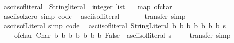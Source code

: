 \begin{isabellebody}
\ asciis{\isacharunderscore}{\kern0pt}of{\isacharunderscore}{\kern0pt}literal\ {\isacharcolon}{\kern0pt}{\isacharcolon}{\kern0pt}\ {\isachardoublequoteopen}String{\isachardot}{\kern0pt}literal\ {\isasymRightarrow}\ integer\ list{\isachardoublequoteclose}\isanewline
\ \ \ {\isachardoublequoteopen}map\ of{\isacharunderscore}{\kern0pt}char{\isachardoublequoteclose}\isanewline
%
\isadelimproof
\ \ %
\endisadelimproof
%
\isatagproof
\isacommand{{\isachardot}{\kern0pt}}\isamarkupfalse%
\isanewline
\isanewline
{}%
\endisatagproof
{\isafoldproof}%
%
\isadelimproof
%
\endisadelimproof
\ \isamarkupfalse%
\ asciis{\isacharunderscore}{\kern0pt}of{\isacharunderscore}{\kern0pt}zero\ {\isacharbrackleft}{\kern0pt}simp{\isacharcomma}{\kern0pt}\ code{\isacharbrackright}{\kern0pt}{\isacharcolon}{\kern0pt}\isanewline
\ \ {\isachardoublequoteopen}asciis{\isacharunderscore}{\kern0pt}of{\isacharunderscore}{\kern0pt}literal\ {}\ {\isacharequal}{\kern0pt}\ {\isacharbrackleft}{\kern0pt}{\isacharbrackright}{\kern0pt}{\isachardoublequoteclose}\isanewline
%
\isadelimproof
\ \ %
\endisadelimproof
%
\isatagproof
{}\isamarkupfalse%
\ transfer\ simp\isanewline
\isanewline
{}%
\endisatagproof
{\isafoldproof}%
%
\isadelimproof
%
\endisadelimproof
\ \isamarkupfalse%
\ asciis{\isacharunderscore}{\kern0pt}of{\isacharunderscore}{\kern0pt}Literal\ {\isacharbrackleft}{\kern0pt}simp{\isacharcomma}{\kern0pt}\ code{\isacharbrackright}{\kern0pt}{\isacharcolon}{\kern0pt}\isanewline
\ \ {\isachardoublequoteopen}asciis{\isacharunderscore}{\kern0pt}of{\isacharunderscore}{\kern0pt}literal\ {\isacharparenleft}{\kern0pt}String{\isachardot}{\kern0pt}Literal\ b{}\ b{}\ b{}\ b{}\ b{}\ b{}\ b{}\ s{\isacharparenright}{\kern0pt}\ {\isacharequal}{\kern0pt}\isanewline
\ \ \ \ of{\isacharunderscore}{\kern0pt}char\ {\isacharparenleft}{\kern0pt}Char\ b{}\ b{}\ b{}\ b{}\ b{}\ b{}\ b{}\ False{\isacharparenright}{\kern0pt}\ {\isacharhash}{\kern0pt}\ asciis{\isacharunderscore}{\kern0pt}of{\isacharunderscore}{\kern0pt}literal\ s\ {\isachardoublequoteclose}\isanewline
%
\isadelimproof
\ \ %
\endisadelimproof
%
\isatagproof
{}\isamarkupfalse%
\ transfer\ simp\isanewline
\isanewline
{}%
\endisatagproof
{\isafoldproof}%
%
\isadelimproof
%
\endisadelimproof
\ \isamarkupfalse%

\end{isabellebody}
